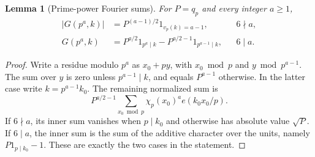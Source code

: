 \documentclass[11pt,a4paper]{article}
\numberwithin{equation}{section}
\numberwithin{figure}{section}
\newtheorem{lemma}[theorem]{Lemma}
\theoremstyle{definition}
\theoremstyle{remark}
\begin{document}
\begin{lemma}[Prime-power Fourier sums]\label{lem:prime-power-fourier}
For $P=q_p$ and every integer $a\ge1$,
\begin{equation}
 \begin{aligned}
 |G(p^a,k)|&=P^{(a-1)/2}1_{v_p(k)=a-1},&&6\nmid a,\\
 G(p^a,k)&=P^{a/2}1_{p^a\mid k}
             -P^{a/2-1}1_{p^{a-1}\mid k},&&6\mid a.
 \end{aligned}
 \label{eq:gauss-local}
\end{equation}
\end{lemma}

\begin{proof}
Write a residue modulo $p^a$ as $x_0+py$, with $x_0\bmod p$ and
$y\bmod p^{a-1}$.  The sum over $y$ is zero unless $p^{a-1}\mid k$, and
equals $P^{a-1}$ otherwise.  In the latter case write $k=p^{a-1}k_0$.
The remaining normalized sum is
\[
 P^{a/2-1}\sum_{x_0\bmod p}\chi_p(x_0)^a e(k_0x_0/p).
\]
If $6\nmid a$, its inner sum vanishes when $p\mid k_0$ and otherwise has
absolute value $\sqrt P$.  If $6\mid a$, the inner sum is the sum of the
additive character over the units, namely $P1_{p\mid k_0}-1$.  These are
exactly the two cases in the statement.
\end{proof}
\end{document}
